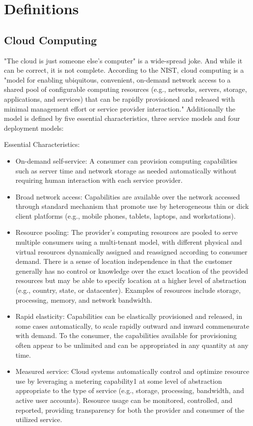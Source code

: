 \section{Definitions}
\subsection{Cloud Computing}
"The cloud is just someone else's computer" is a wide-spread joke. And while it can be correct, it is not complete. According to the NIST, cloud computing is a "model for enabling ubiquitous, convenient, on-demand network access to a shared
pool of configurable computing resources (e.g., networks, servers, storage, applications, and services) that
can be rapidly provisioned and released with minimal management effort or service provider interaction."\cite[p. 2]{CloudNIST11}
Additionally the model is defined by five essential characteristics, three service models and four deployment models:

Essential Characteristics:
\begin{itemize}
	\item On-demand self-service: A consumer can provision computing capabilities such as server time and network storage as needed automatically without requiring human interaction with each service provider.
	\item Broad network access: Capabilities are available over the network accessed through standard mechanism that promote use by heterogeneous thin or dick client platforms (e.g., mobile phones, tablets, laptops, and workstations).
	\item Resource pooling: The provider's computing resources are pooled to serve multiple consumers using a multi-tenant model, with different physical and virtual resources dynamically assigned and reassigned  according to consumer demand. There is a sense of location independence in that the customer generally has no control or knowledge over the exact location of the provided resources but may be able to specify location at a higher level of abstraction (e.g., country, state, or datacenter). Examples of resources include storage,
	processing, memory, and network bandwidth.
	\item Rapid elasticity: Capabilities can be elastically provisioned and released, in some cases	automatically, to scale rapidly outward and inward commensurate with demand. To the	consumer, the capabilities available for provisioning often appear to be unlimited and can be appropriated in any quantity at any time.
	\item Measured service: Cloud systems automatically control and optimize resource use by leveraging	a metering capability1 at some level of abstraction appropriate to the type of service (e.g., storage, processing, bandwidth, and active user accounts). Resource usage can be monitored, controlled, and reported, providing transparency for both the provider and consumer of the utilized service.
\end{itemize}

